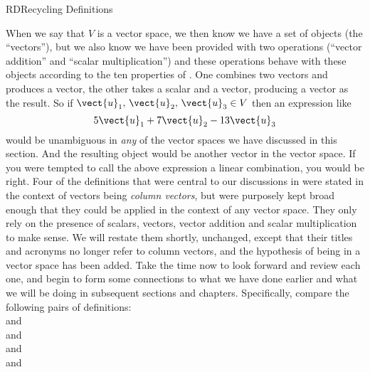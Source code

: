 \begin{subsect}{RD}{Recycling Definitions}
%
\begin{para}When we say that $V$ is a vector space, we then know we have a set of objects (the ``vectors''), but we also know we have been provided with two operations (``vector addition'' and ``scalar multiplication'') and these operations behave with these objects according to the ten properties of .  One combines two vectors and produces a vector, the other takes a scalar and a vector, producing a vector as the result.  So if $\vect{u}_1,\,\vect{u}_2,\,\vect{u}_3\in V$ then an expression like
%
\begin{equation*}
5\vect{u}_1+7\vect{u}_2-13\vect{u}_3
\end{equation*}
%
would be unambiguous in {\em any} of the vector spaces we have discussed in this section.  And the resulting object would be another vector in the vector space.  If you were tempted to call the above expression a linear combination, you would be right.  Four of the definitions that were central to our discussions in  were stated in the context of vectors being {\em column vectors}, but were purposely kept broad enough that they could be applied in the context of any vector space.  They only rely on the presence of scalars, vectors, vector addition and scalar multiplication to make sense.  We will restate them shortly, unchanged, except that their titles and acronyms no longer refer to column vectors, and the hypothesis of being in a vector space has been added.  Take the time now to look forward and review each one, and begin to form some connections to what we have done earlier and what we will be doing in subsequent sections and chapters.  Specifically, compare the following pairs of definitions:\\[6pt]
 and \\
 and \\
 and \\
 and 
\end{para}
%
\end{subsect}
%

